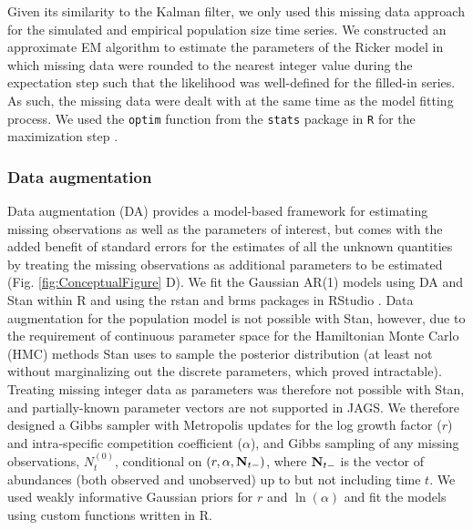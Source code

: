 \documentclass{article}
\begin{document}
\begin{linenumbers}
Given its similarity to the Kalman filter, we only used this missing data approach for the simulated and empirical population size time series. We constructed an approximate EM algorithm to estimate the parameters of the Ricker model in which missing data were rounded to the nearest integer value during the expectation step such that the likelihood was well-defined for the filled-in series. As such, the missing data were dealt with at the same time as the model fitting process. We used the \texttt{optim} function from the \texttt{stats} package in \texttt{R} for the maximization step \citep{r_2021}. %


\subsubsection*{Data augmentation}

Data augmentation (DA) provides a model-based framework for estimating missing observations as well as the parameters of interest, but comes with the added benefit of standard errors for the estimates of all the unknown quantities by treating the missing observations as additional parameters to be estimated (Fig. \ref{fig:ConceptualFigure} D). We fit the Gaussian AR(1) models using DA and Stan \citep{carpenter_stan_2017} within R \citep{} and using the rstan \citep{rstan_package} and brms \citep{burkner2017brms} packages in RStudio \citep{r_2021}. Data augmentation for the population model is not possible with Stan, however, due to the requirement of continuous parameter space for the Hamiltonian Monte Carlo (HMC) methods Stan uses to sample the posterior distribution (at least not without marginalizing out the discrete parameters, which proved intractable). Treating missing integer data as parameters was therefore not possible with Stan, and partially-known parameter vectors are not supported in JAGS. We therefore designed a Gibbs sampler with Metropolis updates for the log growth factor ($r$) and intra-specific competition coefficient ($\alpha$), and Gibbs sampling of any missing observations, $N_{t}^{(0)}$, conditional on $(r, \alpha, {\bf N}_{t-})$, where ${\bf N}_{t-}$ is the vector of abundances (both observed and unobserved) up to but not including time $t$. We used weakly informative Gaussian priors for $r$ and $\ln(\alpha)$ and fit the models using custom functions written in R. %




\end{linenumbers}
\end{document}
